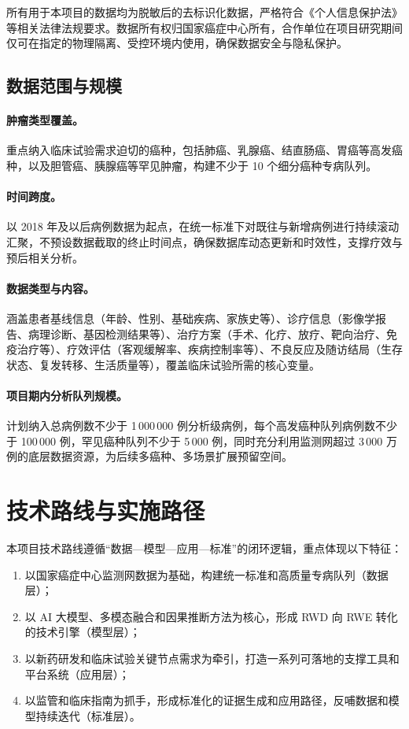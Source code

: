 \documentclass[12pt, a4paper, fontset=mac]{ctexart} %
\begin{document}
所有用于本项目的数据均为脱敏后的去标识化数据，严格符合《个人信息保护法》等相关法律法规要求。数据所有权归国家癌症中心所有，合作单位在项目研究期间仅可在指定的物理隔离、受控环境内使用，确保数据安全与隐私保护。

\subsection{数据范围与规模}

\paragraph{肿瘤类型覆盖。} 重点纳入临床试验需求迫切的癌种，包括肺癌、乳腺癌、结直肠癌、胃癌等高发癌种，以及胆管癌、胰腺癌等罕见肿瘤，构建不少于 10 个细分癌种专病队列。
\paragraph{时间跨度。} 以 2018 年及以后病例数据为起点，在统一标准下对既往与新增病例进行持续滚动汇聚，不预设数据截取的终止时间点，确保数据库动态更新和时效性，支撑疗效与预后相关分析。
\paragraph{数据类型与内容。} 涵盖患者基线信息（年龄、性别、基础疾病、家族史等）、诊疗信息（影像学报告、病理诊断、基因检测结果等）、治疗方案（手术、化疗、放疗、靶向治疗、免疫治疗等）、疗效评估（客观缓解率、疾病控制率等）、不良反应及随访结局（生存状态、复发转移、生活质量等），覆盖临床试验所需的核心变量。
\paragraph{项目期内分析队列规模。} 计划纳入总病例数不少于 1\,000\,000 例分析级病例，每个高发癌种队列病例数不少于 100\,000 例，罕见癌种队列不少于 5\,000 例，同时充分利用监测网超过 3\,000 万例的底层数据资源，为后续多癌种、多场景扩展预留空间。



\section{技术路线与实施路径}

本项目技术路线遵循“数据—模型—应用—标准”的闭环逻辑，重点体现以下特征：

\begin{enumerate}[label=(\arabic*)]
  \item 以国家癌症中心监测网数据为基础，构建统一标准和高质量专病队列（数据层）；
  \item 以 AI 大模型、多模态融合和因果推断方法为核心，形成 RWD 向 RWE 转化的技术引擎（模型层）；
  \item 以新药研发和临床试验关键节点需求为牵引，打造一系列可落地的支撑工具和平台系统（应用层）；
  \item 以监管和临床指南为抓手，形成标准化的证据生成和应用路径，反哺数据和模型持续迭代（标准层）。
\end{enumerate}
\end{document}
